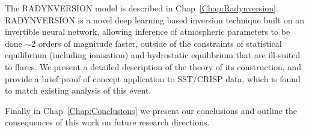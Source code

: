 The RADYNVERSION model is described in Chap~\ref{Chap:Radynversion}.
RADYNVERSION is a novel deep learning based inversion technique built on an invertible neural network, allowing inference of atmospheric parameters to be done $\sim2$ orders of magnitude faster, outside of the constraints of statistical equilibrium (including ionisation) and hydrostatic equilibrium that are ill-suited to flares.
We present a detailed description of the theory of its construction, and provide a brief proof of concept application to SST/CRISP data, which is found to match existing analysis of this event.

Finally in Chap~\ref{Chap:Conclusions} we present our conclusions and outline the consequences of this work on future research directions.




